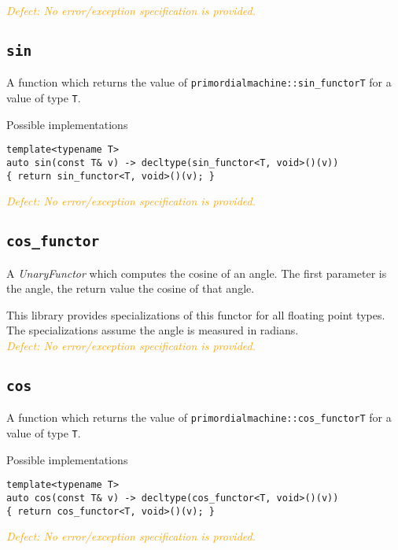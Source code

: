 \documentclass[oneside]{article}
\begin{document}
\noindent{}\textcolor{orange}{\textit{Defect: No error/exception specification is provided.}}

\subsection{\texttt{sin}}
A function which returns the value of \texttt{primordialmachine::sin\_functor\textlangle T\textrangle}
for a value of type \texttt{T}.

\noindent{}Possible implementations
\begin{verbatim}
template<typename T>
auto sin(const T& v) -> decltype(sin_functor<T, void>()(v))
{ return sin_functor<T, void>()(v); }
\end{verbatim}

\noindent{}\textcolor{orange}{\textit{Defect: No error/exception specification is provided.}}

\subsection{\texttt{cos\_functor}}
A \textit{UnaryFunctor} which computes the
cosine
of an angle.
The first parameter is the angle, the return value the cosine of that angle.

\noindent{}This library provides specializations of this functor for all floating point types.
The specializations assume the angle is measured in radians.\\

\noindent{}\textcolor{orange}{\textit{Defect: No error/exception specification is provided.}}

\subsection{\texttt{cos}}
A function which returns the value of \texttt{primordialmachine::cos\_functor\textlangle T\textrangle}
for a value of type \texttt{T}.

\noindent{}Possible implementations
\begin{verbatim}
template<typename T>
auto cos(const T& v) -> decltype(cos_functor<T, void>()(v))
{ return cos_functor<T, void>()(v); }
\end{verbatim}

\noindent{}\textcolor{orange}{\textit{Defect: No error/exception specification is provided.}}

\end{document}
